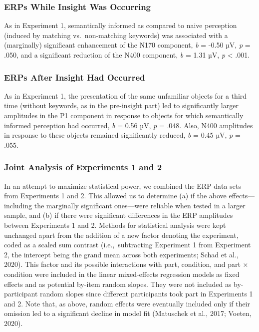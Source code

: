 \documentclass[
  english,
  doc,12pt,twoside,floatsintext]{apa7}
\begin{document}
\hypertarget{erps-while-insight-was-occurring-1}{%
\subsubsection{ERPs While Insight Was Occurring}\label{erps-while-insight-was-occurring-1}}

As in Experiment 1, semantically informed as compared to naive perception (induced by matching vs.~non-matching keywords) was associated with a (marginally) significant enhancement of the N170 component, \emph{b} = -0.50 µV, \emph{p} = .050, and a significant reduction of the N400 component, \emph{b} = 1.31 µV, \emph{p} \textless{} .001.

\hypertarget{erps-after-insight-had-occurred-1}{%
\subsubsection{ERPs After Insight Had Occurred}\label{erps-after-insight-had-occurred-1}}

As in Experiment 1, the presentation of the same unfamiliar objects for a third time (without keywords, as in the pre-insight part) led to significantly larger amplitudes in the P1 component in response to objects for which semantically informed perception had occurred, \emph{b} = 0.56 µV, \emph{p} = .048. Also, N400 amplitudes in response to these objects remained significantly reduced, \emph{b} = 0.45 µV, \emph{p} = .055.

\hypertarget{joint-analysis-of-experiments-1-and-2}{%
\subsubsection{Joint Analysis of Experiments 1 and 2}\label{joint-analysis-of-experiments-1-and-2}}

In an attempt to maximize statistical power, we combined the ERP data sets from Experiments 1 and 2. This allowed us to determine (a) if the above effects---including the marginally significant ones---were reliable when tested in a larger sample, and (b) if there were significant differences in the ERP amplitudes between Experiments 1 and 2. Methods for statistical analysis were kept unchanged apart from the addition of a new factor denoting the experiment, coded as a scaled sum contrast (i.e.,~subtracting Experiment 1 from Experiment 2, the intercept being the grand mean across both experiments; Schad et al., 2020). This factor and its possible interactions with part, condition, and part × condition were included in the linear mixed-effects regression models as fixed effects and as potential by-item random slopes. They were not included as by-participant random slopes since different participants took part in Experiments 1 and 2. Note that, as above, random effects were eventually included only if their omission led to a significant decline in model fit (Matuschek et al., 2017; Voeten, 2020).
\end{document}
